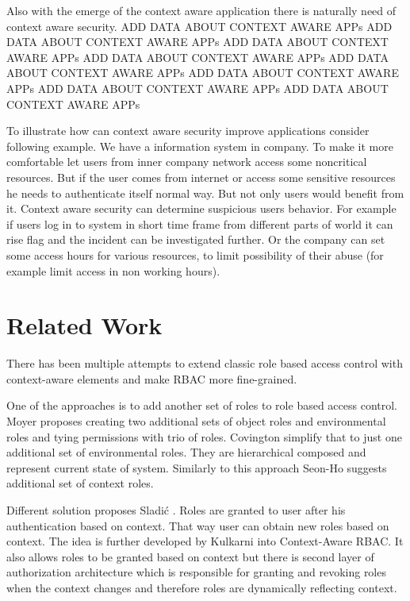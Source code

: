 \documentclass{poster15}
\begin{document}
Also with the emerge of the context aware application there is naturally need of context aware security. ADD DATA ABOUT CONTEXT AWARE APPs ADD DATA ABOUT CONTEXT AWARE APPs ADD DATA ABOUT CONTEXT AWARE APPs ADD DATA ABOUT CONTEXT AWARE APPs ADD DATA ABOUT CONTEXT AWARE APPs ADD DATA ABOUT CONTEXT AWARE APPs ADD DATA ABOUT CONTEXT AWARE APPs ADD DATA ABOUT CONTEXT AWARE APPs

To illustrate how can context aware security improve applications consider following example. We have a information system in company. To make it more comfortable let users from inner company network access some noncritical resources. But if the user comes from internet or access some sensitive resources he needs to authenticate itself normal way. But not only users would benefit from it. Context aware security can determine suspicious users behavior. For example if users log in to system in short time frame from different parts of world it can rise flag and the incident can be investigated further. Or the company can set some access hours for various resources, to limit possibility of their abuse (for example limit access in non working hours).

\section{Related Work}

There has been multiple attempts to extend classic role based access control with context-aware elements and make RBAC more fine-grained.

One of the approaches is to add another set of roles to role based access control. Moyer \cite{grbac} proposes creating two additional sets of object roles and environmental roles and tying permissions with trio of roles. Covington \cite{envroles} simplify that to just one additional set of environmental roles. They are hierarchical composed and represent current state of system. Similarly to this approach Seon-Ho \cite{contextroles} suggests additional set of context roles.

Different solution proposes Sladi\'c \cite{contextaccess}. Roles are granted to user after his authentication based on context. That way user can obtain new roles based on context. The idea is further developed by Kulkarni \cite{contextawarerbac} into Context-Aware RBAC. It also allows roles to be granted based on context but there is second layer of authorization architecture which is responsible for granting and revoking roles when the context changes and therefore roles are dynamically reflecting context.
\end{document}
